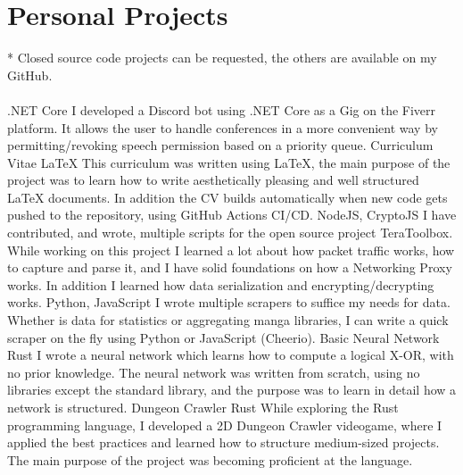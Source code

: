\section*{Personal Projects}
{\color{violet}*}
\footnotesize
Closed source code projects can be requested, the others are available on my GitHub.\\\\
\normalsize
{}
  {.NET Core}
  {I developed a Discord bot using .NET Core as a Gig on the Fiverr platform.
   It allows the user to handle conferences in a more convenient way by permitting/revoking speech permission based on a priority queue.}
\tech
  {Curriculum Vitae}
  {LaTeX}
  {This curriculum was written using LaTeX, the main purpose of the project was to learn how to write aesthetically pleasing and well structured LaTeX documents. In addition the CV builds automatically when new code gets pushed to the repository, using GitHub Actions CI/CD.}
  {NodeJS, CryptoJS}
  {I have contributed, and wrote, multiple scripts for the open source project TeraToolbox. While working on this project I learned a lot about how packet traffic works, how to capture and parse it, and I have solid foundations on how a Networking Proxy works. In addition I learned how data serialization and encrypting/decrypting works.}
  {Python, JavaScript}
  {I wrote multiple scrapers to suffice my needs for data. Whether is data for statistics or aggregating manga libraries, I can write a quick scraper on the fly using Python or JavaScript (Cheerio).}
\tech
  {Basic Neural Network}
  {Rust}
  {I wrote a neural network which learns how to compute a logical X-OR, with no prior knowledge. The neural network was written from scratch, using no libraries except the standard library, and the purpose was to learn in detail how a network is structured.}
\tech
  {Dungeon Crawler}
  {Rust}
  {While exploring the Rust programming language, I developed a 2D Dungeon Crawler videogame, where I applied the best practices and learned how to structure medium-sized projects. The main purpose of the project was becoming proficient at the language.}
  